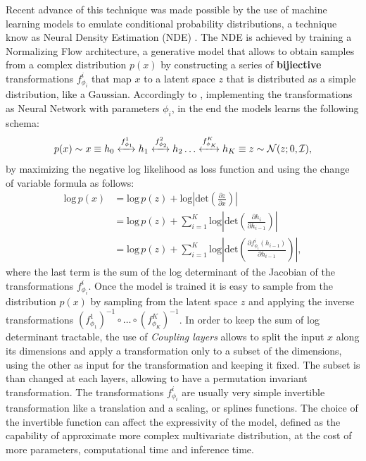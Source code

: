 Recent advance of this technique was made possible by the use of machine learning models to emulate conditional probability distributions, a technique know as Neural Density Estimation (NDE) \cite{papamakariosNeuralDensityEstimation2019}. The NDE is achieved by training a Normalizing Flow architecture, a generative model that allows to obtain samples from a complex distribution $p(x)$ by constructing a series of \textbf{bijiective} transformations  $f_{\phi_i}^i$ that map $x$ to a latent space $z$ that is distributed as a simple distribution, like a Gaussian. Accordingly to \cite{kingmaGlowGenerativeFlow2018}, implementing the transformations as Neural Network with parameters $\phi_i$, in the end the models learns the following schema:
\begin{equation}
p(x) \sim x \equiv h_0 \xleftrightarrow{\text{$f_{\phi_1}^1$}} h_1 \xleftrightarrow{\text{$f_{\phi_2}^2$}} h_2 \dots \xleftrightarrow{\text{$f_{\phi_K}^K$}} h_K \equiv z \sim \mathcal{N}(z; 0, \mathcal{I}),
\end{equation}
by maximizing the negative log likelihood as loss function and using the change of variable formula as follows:
\begin{equation}
\begin{aligned}
    \text{log} \, p(x) &= \text{log} \, p(z) + \text{log} \left| \text{det} \left( \frac{\partial z}{\partial x} \right) \right| \\
    &= \text{log} \, p(z) + \sum_{i=1}^K \text{log} \left| \text{det} \left( \frac{\partial h_{i}}{\partial h_{i-1}} \right) \right| \\
    &= \text{log} \, p(z) + \sum_{i=1}^K \text{log} \left| \text{det} \left( \frac{\partial f_{\phi_i}^i(h_{i-1})}{\partial h_{i-1}} \right) \right|,
\label{eq:ChangeOfVariable}
\end{aligned}
\end{equation}
where the last term is the sum of the log determinant of the Jacobian of the transformations $f_{\phi_i}^i$. Once the model is trained it is easy to sample from the distribution $p(x)$ by sampling from the latent space $z$ and applying the inverse transformations $(f_{\phi_1}^1)^{-1} \circ \dots \circ (f_{\phi_K}^K)^{-1}$.
In order to keep the sum of log determinant tractable, the use of \textit{Coupling layers} allows to split the input $x$ along its dimensions and apply a transformation only to a subset of the dimensions, using the other as input for the transformation and keeping it fixed. The subset is than changed at each layers, allowing to have a permutation invariant transformation. The transformations $f^{i}_{\phi_i}$ are usually very simple invertible transformation like a translation and a scaling, or splines functions. The choice of the invertible function can affect the expressivity of the model, defined as the capability of approximate more complex multivariate distribution, at the cost of more parameters, computational time and inference time. 

